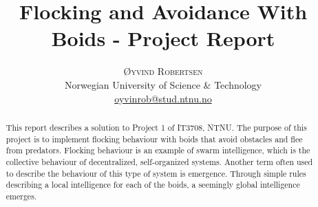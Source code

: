 \documentclass[twoside]{article}
\title{\vspace{-15mm}\fontsize{24pt}{10pt}\selectfont\textbf{Flocking and Avoidance With Boids - Project Report}} %
\author{
    \large
    \textsc{Øyvind Robertsen} \\ %
    \normalsize Norwegian University of Science \& Technology \\ %
    \normalsize \href{mailto:oyvinrob@stud.ntnu.no}{oyvinrob@stud.ntnu.no} %
    \vspace{-5mm}
}
\date{}
\begin{document}
\maketitle %

\thispagestyle{fancy} %


\begin{abstract}

\noindent This report describes a solution to Project 1 of IT3708, NTNU. 
The purpose of this project is to implement flocking behaviour with boids that avoid obstacles and flee from predators.
Flocking behaviour is an example of swarm intelligence, which is the collective behaviour of decentralized, self-organized systems.
Another term often used to describe the behaviour of this type of system is emergence.
Through simple rules describing a local intelligence for each of the boids, a seemingly global intelligence emerges.


\end{abstract}

\end{document}

